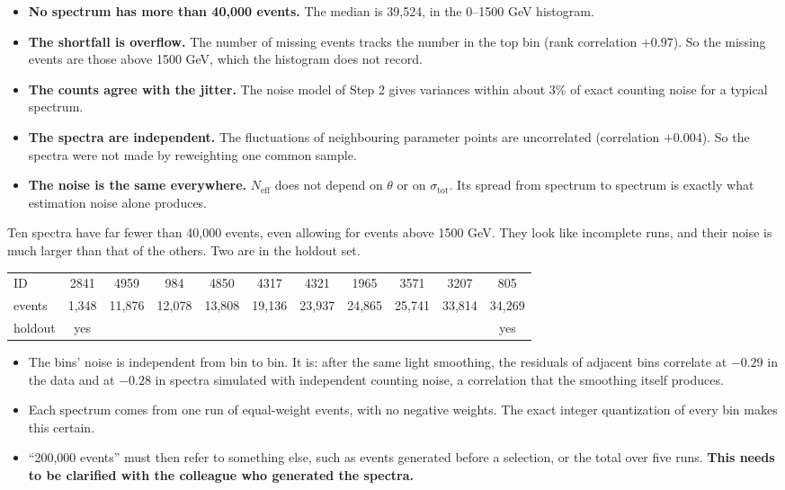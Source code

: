 \documentclass[11pt]{article}
\newcommand{\neff}{N_\text{eff}}
\newcommand{\stot}{\sigma_\text{tot}}
\begin{document}
\begin{itemize}
  \item \textbf{No spectrum has more than 40,000 events.} The median is 39,524, in the
  0--1500 GeV histogram.
  \item \textbf{The shortfall is overflow.} The number of missing events tracks the
  number in the top bin (rank correlation $+0.97$). So the missing events are those
  above 1500 GeV, which the histogram does not record.
  \item \textbf{The counts agree with the jitter.} The noise model of Step 2 gives
  variances within about 3\% of exact counting noise for a typical spectrum.
  \item \textbf{The spectra are independent.} The fluctuations of neighbouring
  parameter points are uncorrelated (correlation $+0.004$). So the spectra were not
  made by reweighting one common sample.
  \item \textbf{The noise is the same everywhere.} $\neff$ does not depend on $\theta$
  or on $\stot$. Its spread from spectrum to spectrum is exactly what estimation noise
  alone produces.
\end{itemize}

\begin{watch}
Ten spectra have far fewer than 40,000 events, even allowing for events above
1500 GeV. They look like incomplete runs, and their noise is much larger than that of
the others. Two are in the holdout set.
\begin{center}
\small
\begin{tabular}{lcccccccccc}
\toprule
ID & 2841 & 4959 & 984 & 4850 & 4317 & 4321 & 1965 & 3571 & 3207 & 805\\
events & 1,348 & 11,876 & 12,078 & 13,808 & 19,136 & 23,937 & 24,865 & 25,741 & 33,814 & 34,269\\
holdout & yes & & & & & & & & & yes\\
\bottomrule
\end{tabular}
\end{center}
\end{watch}

\begin{assume}
\begin{itemize}
  \item The bins' noise is independent from bin to bin. It is: after the same light
  smoothing, the residuals of adjacent bins correlate at $-0.29$ in the data and at
  $-0.28$ in spectra simulated with independent counting noise, a correlation that the
  smoothing itself produces.
  \item Each spectrum comes from one run of equal-weight events, with no negative
  weights. The exact integer quantization of every bin makes this certain.
  \item ``200,000 events'' must then refer to something else, such as events generated
  before a selection, or the total over five runs. \textbf{This needs to be clarified
  with the colleague who generated the spectra.}
\end{itemize}
\end{assume}
\end{document}
